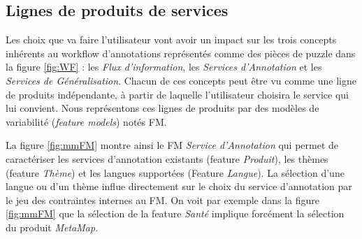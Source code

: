 \documentclass[]{easychair}
\begin{document}


\subsection{Lignes de produits de services}
Les choix que va faire l'utilisateur vont avoir un impact sur les trois concepts inhérents au workflow d'annotations représentés comme des pièces de puzzle dans la figure \ref{fig:WF} : les \textit{Flux d'information}, les \textit{Services d'Annotation} et les \textit{Services de Généralisation}. Chacun de ces concepts peut être vu comme une ligne de produits indépendante, à partir de laquelle l'utilisateur choisira le service qui lui convient. Nous représentons ces lignes de produits par des modèles de variabilité (\textsl{feature models}) notés FM.

La figure \ref{fig:mmFM} montre ainsi le FM \textit{Service d'Annotation} qui permet de caractériser les services d'annotation existants (feature \textit{Produit}), les thèmes (feature \textit{Thème}) et les langues supportées (Feature \textit{Langue}). La sélection d'une langue ou d'un thème influe directement sur le choix du service d'annotation par le jeu des contraintes internes au FM. On voit par exemple dans la figure \ref{fig:mmFM} que la sélection de la feature \textit{Santé} implique forcément la sélection du produit \textit{MetaMap}.


\end{document}
